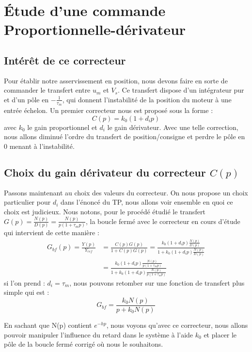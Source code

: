 \chapter{Étude d'une commande Proportionnelle-dérivateur}
\section{Intérêt de ce correcteur}
Pour établir notre asservissement en position, nous devons faire en sorte de commander le transfert entre $u_m$ et $V_s$. Ce transfert dispose d'un intégrateur pur et d'un pôle en $-\frac{1}{\tau _m}$, qui donnent l'instabilité de la position du moteur à une entrée échelon. Un premier correcteur nous est proposé sous la forme :
\begin{equation}\label{eqn:correcteurProportionnel}
C(p) = k_0(1+d_ip)
\end{equation} 
avec $k_0$ le gain proportionnel et $d_i$ le gain dérivateur. Avec une telle correction, nous allons diminué l'ordre du transfert de position/consigne et perdre le pôle en 0 menant à l'instabilité. 

\section{Choix du gain dérivateur du correcteur $C(p)$}
Passons maintenant au choix des valeurs du correcteur. On nous propose un choix particulier pour $d_i$ dans l'énoncé du TP, nous allons voir ensemble en quoi ce choix est judicieux. Nous notons, pour le procédé étudié le transfert $G(p) = \frac{N(p)}{D(p)}=\frac{N(p)}{p(1+\tau_mp)}$, la boucle fermé avec le correcteur en cours d'étude qui intervient de cette manière : 
\begin{align*}
G_{bf}(p) = \frac{Y(p)}{Y_{ref}}	&= \frac{C(p)G(p)}{1+C(p)G(p)} 
										= \frac{k_0(1+d_ip) \frac{N(p)}{D(p)}}{1+k_0(1+d_ip) \frac{N(p)}{D(p)}}	\\
									&= \frac{k_0(1+d_ip) \frac{N(p)}{p(1+\tau_mp)}}{1+ k_0(1+d_ip) \frac{N(p)}{p(1+\tau_mp)}}
\end{align*}
si l'on prend : $d_i = \tau_m$, nous pouvons retomber sur une fonction de transfert plus simple qui est :
\begin{equation}\label{eqn:boucleFermeC_PD}
G_{bf} = \frac{k_0 N(p)}{p+k_0N(p)}
\end{equation}

En sachant que N(p) contient $e^{-hp}$, nous voyons qu'avec ce correcteur, nous allons pouvoir manipuler l'influence du retard dans le système à l'aide $k_0$ et placer le pôle de la boucle fermé corrigé où nous le souhaitons.

